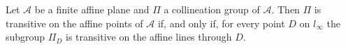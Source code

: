 Let $\mathcal{A}$ be a finite affine plane and $\Pi$ a collineation group of $\mathcal{A}$. Then $\Pi$ is transitive on the affine points of $\mathcal{A}$ if, and only if, for every point $D$ on $l_{\infty}$ the subgroup $\Pi_D$ is transitive on the affine lines through $D$.

